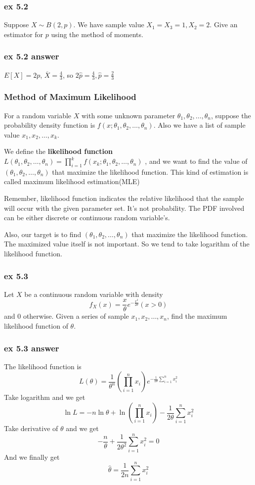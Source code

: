 \documentclass{beamer}
\begin{document}
\begin{frame}
    \frametitle{ex 5.2}
    Suppose $X\sim B(2,p)$. We have sample value $X_1=X_3=1, X_2=2$. Give an estimator for $p$ using the method of moments.

\end{frame}

\begin{frame}
    \frametitle{ex 5.2 answer}
    $E[X]=2p$, $\overline{X}=\frac{4}{3}$, so $2\hat{p}=\frac{4}{3}, \hat{p}=\frac{2}{3}$

\end{frame}

\begin{frame}
    \frametitle{Method of Maximum Likelihood}
    For a random variable $X$ with some unknown parameter $\theta_1, \theta_2, \dots , \theta_n$, suppose the probability density function is $f(x;\theta_1, \theta_2, \dots , \theta_n)$. Also we have a list of sample value $x_1, x_2, \dots , x_k$.\par
    We define the \textbf{likelihood function} $L(\theta_1, \theta_2, \dots , \theta_n)=\prod\limits_{i=1}^{k} f(x_k;\theta_1, \theta_2, \dots , \theta_n)$ , and we want to find the value of $(\theta_1, \theta_2, \dots , \theta_n)$ that maximize the likelihood function. This kind of estimation is called maximum likelihood estimation(MLE) \par
    \vspace{0.3cm}
    Remember, likelihood function indicates the relative likelihood that the sample will occur with the given parameter set. It's not probability. The PDF involved can be either discrete or continuous random variable's.\par
    Also, our target is to find $(\theta_1, \theta_2, \dots , \theta_n)$ that maximize the likelihood function. The maximized value itself is not important. So we tend to take logarithm of the likelihood function.

\end{frame}

\begin{frame}
    \frametitle{ex 5.3}
    Let $X$ be a continuous random variable with density 
    \[f_{X}(x)=\frac{x}{\theta}e^{-\frac{x^2}{2\theta}}(x>0)\]
    and 0 otherwise. Given a series of sample $x_1, x_2, \dots , x_n$, find the maximum likelihood function of $\theta$.
    

\end{frame}

\begin{frame}
    \frametitle{ex 5.3 answer}

    The likelihood function is
    \[L(\theta)=\frac{1}{\theta^n}(\prod\limits_{i=1}^{n}x_i) e^{-\frac{1}{2\theta} \sum\limits_{i=1}^{n}x_{i}^2} \]
    Take logarithm and we get 
    \[\ln L=-n\ln \theta +\ln(\prod\limits_{i=1}^{n}x_i)-\frac{1}{2\theta} \sum\limits_{i=1}^{n}x_{i}^2\]
    Take derivative of $\theta$ and we get
    \[-\frac{n}{\theta}+\frac{1}{2\theta^2}\sum\limits_{i=1}^{n}x_{i}^2=0\]
    And we finally get 
    \[\hat{\theta}=\frac{1}{2n}\sum\limits_{i=1}^{n}x_{i}^2\]

\end{frame}
\end{document}
